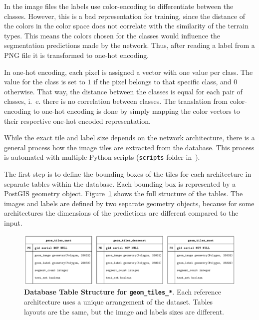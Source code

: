 In the image files the labels use color-encoding to differentiate between the classes. However, this is a bad representation for training, since the distance of the colors in the color space does not correlate with the similarity of the terrain types. This means the colors chosen for the classes would influence the segmentation predictions made by the network. Thus, after reading a label from a PNG file it is transformed to one-hot encoding.

In one-hot encoding, each pixel is assigned a vector with one value per class. The value for the class is set to $1$ if the pixel belongs to that specific class, and $0$ otherwise. That way, the distance between the classes is equal for each pair of classes, i.~e. there is no correlation between classes. The translation from color-encoding to one-hot encoding is done by simply mapping the color vectors to their respective one-hot encoded representation.

While the exact tile and label size depends on the network architecture, there is a general process how the image tiles are extracted from the database. This process is automated with multiple Python scripts (\texttt{scripts} folder in~\cite{thesis-code20}).

The first step is to define the bounding boxes of the tiles for each architecture in separate tables within the database. Each bounding box is represented by a  PostGIS geometry object. Figure~\ref{fig:geom_tiles_entities} shows the full structure of the tables. The images and labels are defined by two separate geometry objects, because for some architectures the dimensions of the predictions are different compared to the input.

\begin{figure}[h]
    \centering
    \includegraphics[width=\textwidth]{images/geom_tiles_entities}
    \caption[Database Table Structure for \texttt{geom\_tiles\_*}]
    {\textbf{Database Table Structure for \texttt{geom\_tiles\_*}}. Each reference architecture uses a unique arrangement of the dataset. Tables layouts are the same, but the image and labels sizes are different.}
    \label{fig:geom_tiles_entities}
\end{figure}

